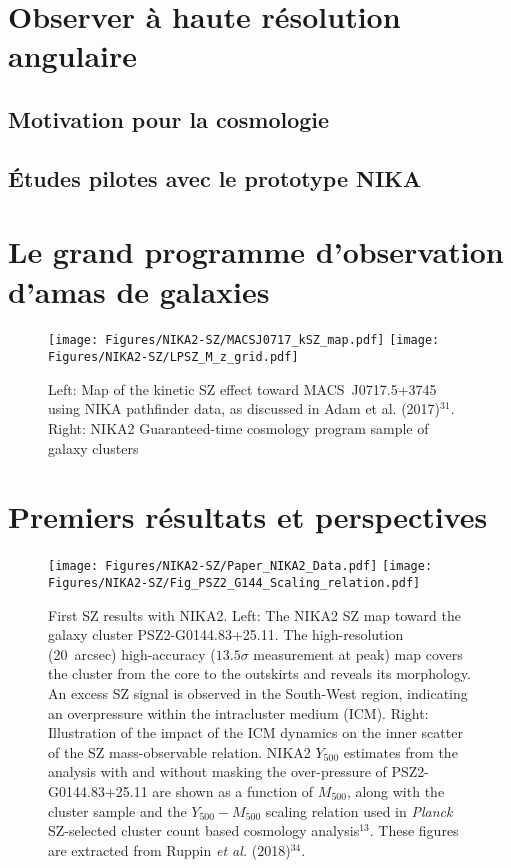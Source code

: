 \documentclass[a4paper, 12pt]{report}
\begin{document}
\section{Observer à haute résolution angulaire}

\subsection{Motivation pour la cosmologie}
{\color{vert}\lipsum[2-4]}
\subsection{\'Etudes pilotes avec le prototype NIKA}
{\color{vert}\lipsum[5-7]}

\section{Le grand programme d'observation d'amas de galaxies}

{\color{vert}\lipsum[2-5]}

\begin{figure}
  \centering
  \texttt{[image: Figures/NIKA2-SZ/MACSJ0717\_kSZ\_map.pdf]}
  \hspace{4mm}
  \texttt{[image: Figures/NIKA2-SZ/LPSZ\_M\_z\_grid.pdf]}
  \caption{Left: Map of the kinetic SZ effect toward \mbox{MACS~J0717.5+3745} using NIKA pathfinder data, as discussed in Adam et al. (2017)$^{31}$. Right: NIKA2 Guaranteed-time cosmology program sample of galaxy clusters}
  \label{fig:nikanika2}
\end{figure}

\section{Premiers résultats et perspectives}

{\color{vert}\lipsum[2-5]}

\begin{figure}
  \centering
  \texttt{[image: Figures/NIKA2-SZ/Paper\_NIKA2\_Data.pdf]}
  \texttt{[image: Figures/NIKA2-SZ/Fig\_PSZ2\_G144\_Scaling\_relation.pdf]}
  \caption{First SZ results with NIKA2. Left: The NIKA2 SZ map toward the galaxy cluster PSZ2-G0144.83+25.11. The high-resolution (20~arcsec) high-accuracy ($13.5\sigma $ measurement at peak) map covers the cluster from the core to the outskirts and reveals its morphology. An excess SZ signal is observed in the South-West region, indicating an overpressure within the intracluster medium (ICM). Right: Illustration of the impact of the ICM dynamics on the inner scatter of the SZ mass-observable relation. NIKA2 $Y_{500}$ estimates from the analysis with and without masking the over-pressure of PSZ2-G0144.83+25.11 are shown as a function of $M_{500}$, along with the cluster sample and the $Y_{500}-M_{500}$ scaling relation used in \emph{Planck} SZ-selected cluster count based cosmology analysis$^{13}$. These figures are extracted from Ruppin {\it et al.} (2018)$^{34}$. }
  \label{fig:nika2-sz}
\end{figure}
\end{document}
